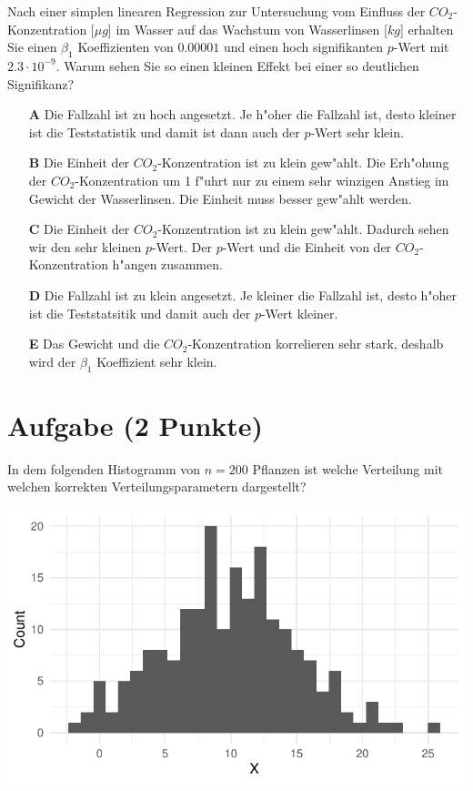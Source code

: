 \documentclass[a4paper, 10pt]{scrartcl}\usepackage[]{graphicx}\usepackage[]{xcolor}
\makeatletter
\def\maxwidth{ %
  \ifdim\Gin@nat@width>\linewidth
    \linewidth
  \else
    \Gin@nat@width
  \fi
}
\makeatother
\begin{document}
Nach einer simplen linearen Regression zur Untersuchung vom Einfluss der
$CO_2$-Konzentration [$\mu g$] im Wasser auf das Wachstum von Wasserlinsen
[$kg$] erhalten Sie einen $\beta_1$ Koeffizienten von $0.00001$ und einen
hoch signifikanten $p$-Wert mit $2.3\cdot 10^{-9}$. Warum sehen Sie so einen kleinen
Effekt bei einer so deutlichen Signifikanz? 




\begin{enumerate}
\item [\textbf{A} \msquare] Die Fallzahl ist zu hoch angesetzt. Je h{"o}her die Fallzahl ist, desto kleiner ist die Teststatistik und damit ist dann auch der $p$-Wert sehr klein.
\item [\textbf{B} \msquare] Die Einheit der $CO_2$-Konzentration ist zu klein gew{"a}hlt. Die Erh{"o}hung der $CO_2$-Konzentration um 1 f{"u}hrt nur zu einem sehr winzigen Anstieg im Gewicht der Wasserlinsen. Die Einheit muss besser gew{"a}hlt werden.
\item [\textbf{C} \msquare] Die Einheit der $CO_2$-Konzentration ist zu klein gew{"a}hlt. Dadurch sehen wir den sehr kleinen $p$-Wert. Der $p$-Wert und die Einheit von der $CO_2$-Konzentration h{"a}ngen zusammen.
\item [\textbf{D} \msquare] Die Fallzahl ist zu klein angesetzt. Je kleiner die Fallzahl ist, desto h{"o}her ist die Teststatsitik und damit auch der $p$-Wert kleiner. 
\item [\textbf{E} \msquare] Das Gewicht und die $CO_2$-Konzentration korrelieren sehr stark, deshalb wird der $\beta_1$ Koeffizient sehr klein.
\end{enumerate} 

\section{Aufgabe \hfill (2 Punkte)}

In dem folgenden Histogramm von $n = 200$ Pflanzen ist welche Verteilung
mit welchen korrekten Verteilungsparametern dargestellt?



{\centering \includegraphics[width=\maxwidth]{img/mc-distribution-02-a-1} 

}
\end{document}
